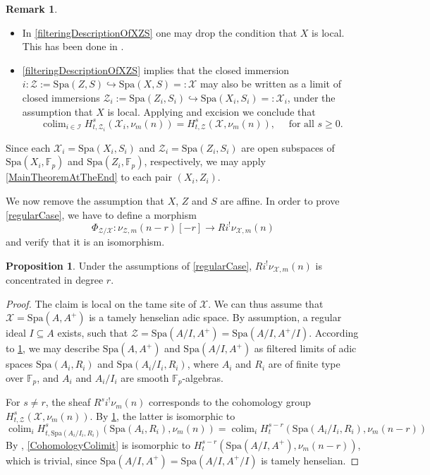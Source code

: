 \documentclass{amsart}
\def\Spa{\textrm{Spa}}
\theoremstyle{definition}
\newtheorem{proposition}[theorem]{Proposition}
\newtheorem{remark}[theorem]{Remark}
\newcommand{\mX}{\mathcal{X}}
\newcommand{\mZ}{\mathcal{Z}}
\newcommand{\mF}{\mathbb{F}}
\DeclareMathOperator*{\colim}{\mathrm{colim}}
\numberwithin{equation}{section}
\begin{document}
\begin{remark}\label{filteringRemark}
	\begin{itemize}
		\item  In \cref{filteringDescriptionOfXZS} one may drop the condition that $X$ is local. This has been done in \cite[Proposition C.8.]{DegliseRationalMotivic}. 
		\item \cref{filteringDescriptionOfXZS} implies that the closed immersion $i:\mZ:=\Spa(Z,S)\hookrightarrow \Spa(X,S)=:\mX$ may also be written as a limit of closed immersions $\mZ_i:=\Spa(Z_i,S_i)\hookrightarrow \Spa(X_i,S_i)=:\mX_i$, under the assumption that $X$ is local. Applying \cite[Corollary 5.4]{HTame} and excision we conclude that 
		\begin{equation}
			\colim_{i\in \mathcal{I}}H^s_{t,\mZ_i}(\mX_i,\nu_m(n))=H^s_{t,\mZ}(\mX,\nu_m(n)), \quad 
			\textrm{ for all } s\geq 0.
		\end{equation}
	\end{itemize}
	
	
	Since each $\mX_i=\Spa(X_i,S_i)$ and $\mZ_i=\Spa(Z_i,S_i)$ are open subspaces \break of  $\Spa(X_i,\mF_p)$ and $\Spa(Z_i,\mF_p)$, respectively, we may apply \cref{MainTheoremAtTheEnd} to each pair $(X_i,Z_i)$.
\end{remark}

We now remove the assumption that $X$, $Z$ and $S$ are affine. In order to prove \cref{regularCase}, we have to define a morphism 
\[
\Phi_{\mZ/\mX}: \nu_{\mZ,m}(n-r)[-r]\to Ri^! \nu_{\mX,m}(n)
\]
and verify that it is an isomorphism. 

\begin{proposition}
	Under the assumptions of \cref{regularCase}, $Ri^!\nu_{\mX,m}(n)$ is concentrated in degree $r$.
\end{proposition} 
\begin{proof}
	The claim is local on the tame site of $\mX$. We can thus assume that $\mX=\Spa(A,A^+)$ is a tamely henselian adic space. By assumption, a regular ideal $I\subseteq A$ exists, such that $\mZ=\Spa(A/I,A^+)=\Spa(A/I,A^+/I)$. According to \cref{filteringRemark}, we may describe $\Spa(A,A^+)$ and $\Spa(A/I,A^+)$ as filtered limits of adic spaces $\Spa(A_i,R_i)$ and $\Spa(A_i/I_i,R_i)$, where $A_i$ and $R_i$ are of finite type over $\mF_p$, and $A_i$  and $A_i/I_i$ are smooth $\mF_p$-algebras. 
	
	For $s\neq r$, the sheaf $R^si^!\nu_{m}(n)$ corresponds to the cohomology group $H^s_{t,\mZ}(\mX,\nu_{m}(n))$. By \cref{filteringRemark}, the latter is isomorphic to 
	\begin{equation}\label{CohomologyColimit}
			\colim_i H^s_{t,\Spa(A_i/I_i,R_i)}(\Spa(A_i,R_i),\nu_m(n))=\colim_i H^{s-r}_{t}(\Spa(A_i/I_i,R_i),\nu_m(n-r))
	\end{equation}
	By \cite[Corollary 5.4]{HTame}, \eqref{CohomologyColimit} is isomorphic to $H^{s-r}_t(\Spa(A/I,A^+),\nu_m(n-r))$, which is trivial, since $\Spa(A/I,A^+)=\Spa(A/I,A^+/I)$ is tamely henselian.
\end{proof}
\end{document}

